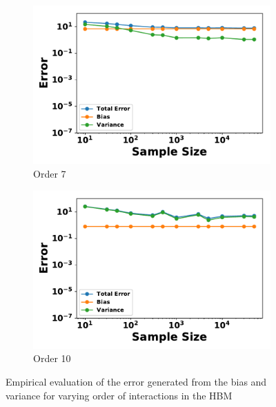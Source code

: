 \documentclass[letterpaper]{article} %
\begin{document}
\begin{figure}[p]
\begin{subfigure}[b]{0.245\textwidth}
              \includegraphics[width=\textwidth]{./HBM_Error_vs_Samples_Order7-eps-converted-to.pdf}
              \caption{Order 7}
          \end{subfigure}
          \begin{subfigure}[b]{0.245\textwidth}
              \centering
              \includegraphics[width=\textwidth]{./HBM_Error_vs_Samples_Order10-eps-converted-to.pdf}
              \caption{Order 10}
          \end{subfigure}
          \caption{Empirical evaluation of the error generated from the bias and variance for varying order of interactions in the HBM} \label{fig:HBM_sample_size}
        \end{figure}
\end{document}
